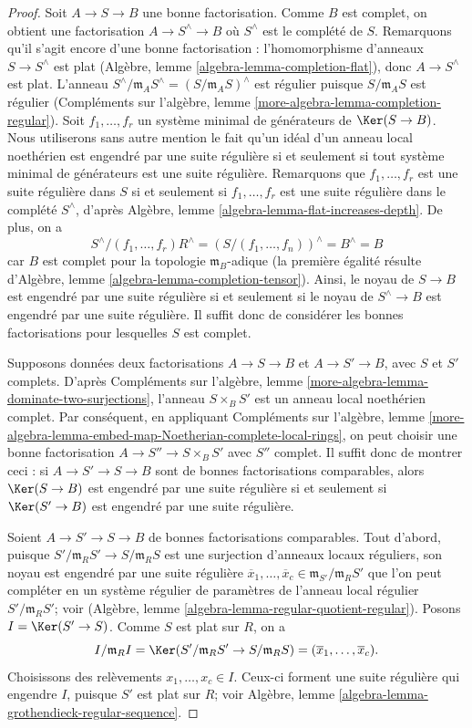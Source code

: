 \begin{proof}
Soit $A \to S \to B$ une bonne factorisation.
Comme $B$ est complet, on obtient une factorisation
$A \to S^\wedge\to B$ où $S^\wedge$ est le complété de $S$.
Remarquons qu'il s'agit encore d'une bonne factorisation :
l'homomorphisme d'anneaux $S \to S^\wedge$ est
plat (Algèbre, lemme \ref{algebra-lemma-completion-flat}),
donc $A \to S^\wedge$ est plat.
L'anneau $S^\wedge/\mathfrak m_A S^\wedge = (S/\mathfrak m_A S)^\wedge$
est régulier puisque $S/\mathfrak m_A S$ est régulier
(Compléments sur l'algèbre, lemme \ref{more-algebra-lemma-completion-regular}).
Soit $f_1, \ldots, f_r$ un système minimal de générateurs
de $\Ker(S \to B)$. Nous utiliserons sans autre mention le
fait qu'un idéal d'un anneau local noethérien est engendré par une suite
régulière si et seulement si tout système minimal de générateurs est
une suite régulière. Remarquons que $f_1, \ldots, f_r$
est une suite régulière dans $S$ si et seulement si $f_1, \ldots, f_r$
est une suite régulière dans le complété $S^\wedge$,
d'après Algèbre, lemme \ref{algebra-lemma-flat-increases-depth}.
De plus, on a
$$
S^\wedge/(f_1, \ldots, f_r)R^\wedge =
(S/(f_1, \ldots, f_n))^\wedge = B^\wedge = B
$$
car $B$ est complet pour la topologie $\mathfrak m_B$-adique (la première égalité résulte
d'Algèbre, lemme \ref{algebra-lemma-completion-tensor}).
Ainsi, le noyau de $S \to B$ est engendré par une suite régulière
si et seulement si le noyau de $S^\wedge\to B$ est engendré par une
suite régulière. Il
suffit donc de considérer les bonnes factorisations pour lesquelles $S$ est complet.

\medskip\noindent
Supposons données deux factorisations $A \to S \to B$ et
$A \to S' \to B$, avec $S$ et $S'$ complets. D'après
Compléments sur l'algèbre, lemme \ref{more-algebra-lemma-dominate-two-surjections},
l'anneau $S \times_B S'$ est un anneau local noethérien complet. Par
conséquent, en appliquant Compléments sur l'algèbre, lemme
\ref{more-algebra-lemma-embed-map-Noetherian-complete-local-rings}, on
peut choisir une bonne factorisation $A \to S'' \to S \times_B S'$
avec $S''$ complet. Il suffit donc de montrer ceci :
si $A \to S' \to S \to B$ sont de bonnes factorisations comparables,
alors $\Ker(S \to B)$ est engendré par une suite régulière
si et seulement si $\Ker(S' \to B)$ est engendré par une suite régulière.

\medskip\noindent
Soient $A \to S' \to S \to B$ de bonnes factorisations comparables. Tout
d'abord, puisque $S'/\mathfrak m_R S' \to S/\mathfrak m_R S$ est
une surjection d'anneaux locaux réguliers, son noyau est engendré
par une suite régulière
$\overline{x}_1, \ldots, \overline{x}_c \in
\mathfrak m_{S'}/\mathfrak m_R S'$
que l'on peut compléter en un système régulier de paramètres de
l'anneau local régulier $S'/\mathfrak m_R S'$;
voir (Algèbre, lemme \ref{algebra-lemma-regular-quotient-regular}).
Posons $I = \Ker(S' \to S)$. Comme $S$ est plat sur $R$, on a
$$
I/\mathfrak m_R I =
\Ker(S'/\mathfrak m_R S' \to S/\mathfrak m_R S) =
(\overline{x}_1, \ldots, \overline{x}_c).
$$
Choisissons des relèvements $x_1, \ldots, x_c \in I$. Ceux-ci forment une suite régulière
qui engendre $I$, puisque $S'$ est plat sur $R$;
voir Algèbre, lemme \ref{algebra-lemma-grothendieck-regular-sequence}.


\end{proof}
